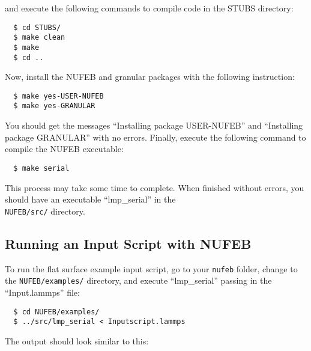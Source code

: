 \documentclass[11pt,a4paper,openright]{article}
\begin{document}
\noindent
and execute the following commands to compile code in the STUBS directory:

\begin{verbatim}
  $ cd STUBS/
  $ make clean
  $ make
  $ cd ..
\end{verbatim}

\noindent
Now, install the NUFEB and granular packages with the following instruction:

\begin{verbatim}
  $ make yes-USER-NUFEB
  $ make yes-GRANULAR
\end{verbatim}

\noindent
You should get the messages ``Installing package USER-NUFEB'' and ``Installing package GRANULAR'' with no errors.  Finally, execute the following command to compile the NUFEB executable:

\begin{verbatim}
  $ make serial
\end{verbatim}

\noindent
This process may take some time to complete.  When finished without errors, you should have an executable ``lmp\_serial'' in the \\ {\tt NUFEB/src/} directory.

\subsection{Running an Input Script with NUFEB}

To run the flat surface example input script, go to your {\tt nufeb} folder, change to the {\tt NUFEB/examples/} directory, and execute ``lmp\_serial'' passing in the ``Input.lammps'' file:

\begin{verbatim}
  $ cd NUFEB/examples/
  $ ../src/lmp_serial < Inputscript.lammps
\end{verbatim}

\noindent
The output should look similar to this:
\end{document}
